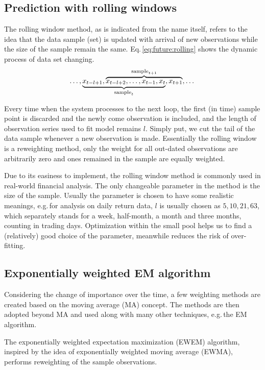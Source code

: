 \subsection{Prediction with rolling windows}
\label{sec:future:lag:rolling}
The rolling window method,
as is indicated from the name itself,
refers to the idea that the data sample (set) is updated with arrival of new observations
while the size of the sample remain the same.
Eq.\,\ref{eq:future:rolling} shows the dynamic process of data set changing.
		\begin{equation}
		\label{eq:future:rolling}
		\dots,\rlap{$\underbrace{\phantom{x_{t-l+1},x_{t-l+2},\dots,x_{t-1},x_{t}}}_{\text{sample}_{t}}$}
		x_{t-l+1},\overbrace{x_{t-l+2},\dots,x_{t-1},x_{t},x_{t+1}}^{\text{sample}_{t+1}},\dots
		\end{equation}

Every time when the system processes to the next loop,
the first (in time) sample point is discarded and the newly come observation is included,
and the length of observation series used to fit model remains $l$.
Simply put, we cut the tail of the data sample whenever a new observation is made.
Essentially the rolling window is a reweighting method,
only the weight for all out-dated observations are arbitrarily zero
and ones remained in the sample are equally weighted.

Due to its easiness to implement,
the rolling window method is commonly used in real-world financial analysis.
The only changeable parameter in the method is the size of the sample.
Usually the parameter is chosen to have some realistic meanings,
e.g.\,for analysis on daily return data,
$l$ is usually chosen as $5,10,21,63$, 
which separately stands for a week, half-month, a month and three months,
counting in trading days.
Optimization within the small pool helps us to find a (relatively) good choice of the parameter,
meanwhile reduces the risk of over-fitting.


\subsection{Exponentially weighted EM algorithm}
\label{sec:future:lag:EWEM}
Considering the change of importance over the time,
a few weighting methods are created based on the moving average (MA) concept.
The methods are then adopted beyond MA and used along with many other techniques,
e.g.\,the EM algorithm.

The exponentially weighted expectation maximization (EWEM) algorithm,
inspired by the idea of exponentially weighted moving average (EWMA),
performs reweighting of the sample observations.

